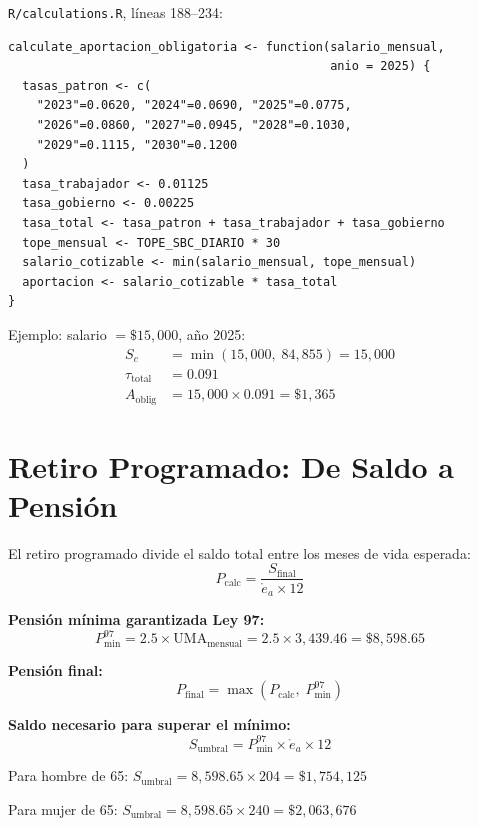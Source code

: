 \documentclass[11pt,a4paper]{report}
\theoremstyle{remark}
\begin{document}
\begin{tcolorbox}[colback=orange!5!white, colframe=orange!75!black, title=\textbf{Aplicaci\'on en C\'odigo}]
\texttt{R/calculations.R}, l\'ineas 188--234:
\begin{lstlisting}
calculate_aportacion_obligatoria <- function(salario_mensual,
                                             anio = 2025) {
  tasas_patron <- c(
    "2023"=0.0620, "2024"=0.0690, "2025"=0.0775,
    "2026"=0.0860, "2027"=0.0945, "2028"=0.1030,
    "2029"=0.1115, "2030"=0.1200
  )
  tasa_trabajador <- 0.01125
  tasa_gobierno <- 0.00225
  tasa_total <- tasa_patron + tasa_trabajador + tasa_gobierno
  tope_mensual <- TOPE_SBC_DIARIO * 30
  salario_cotizable <- min(salario_mensual, tope_mensual)
  aportacion <- salario_cotizable * tasa_total
}
\end{lstlisting}

Ejemplo: salario $= \$15{,}000$, a\~no 2025:
\begin{align*}
S_c &= \min(15{,}000, \; 84{,}855) = 15{,}000 \\
\tau_{\text{total}} &= 0.091 \\
A_{\text{oblig}} &= 15{,}000 \times 0.091 = \$1{,}365
\end{align*}
\end{tcolorbox}

\section{Retiro Programado: De Saldo a Pensi\'on}

\begin{tcolorbox}[colback=blue!5!white, colframe=blue!75!black, title=\textbf{Definici\'on Formal}]
El retiro programado divide el saldo total entre los meses de vida esperada:
\begin{equation}
P_{\text{calc}} = \frac{S_{\text{final}}}{\mathring{e}_a \times 12}
\label{eq:retiro_programado}
\end{equation}

\textbf{Pensi\'on m\'inima garantizada Ley 97:}
\begin{equation}
P_{\min}^{97} = 2.5 \times \text{UMA}_{\text{mensual}} = 2.5 \times 3{,}439.46 = \$8{,}598.65
\label{eq:pension_min_97}
\end{equation}

\textbf{Pensi\'on final:}
\begin{equation}
P_{\text{final}} = \max(P_{\text{calc}}, \; P_{\min}^{97})
\label{eq:pension_final_97}
\end{equation}

\textbf{Saldo necesario para superar el m\'inimo:}
\begin{equation}
S_{\text{umbral}} = P_{\min}^{97} \times \mathring{e}_a \times 12
\end{equation}

Para hombre de 65: $S_{\text{umbral}} = 8{,}598.65 \times 204 = \$1{,}754{,}125$

Para mujer de 65: $S_{\text{umbral}} = 8{,}598.65 \times 240 = \$2{,}063{,}676$
\end{tcolorbox}
\end{document}
